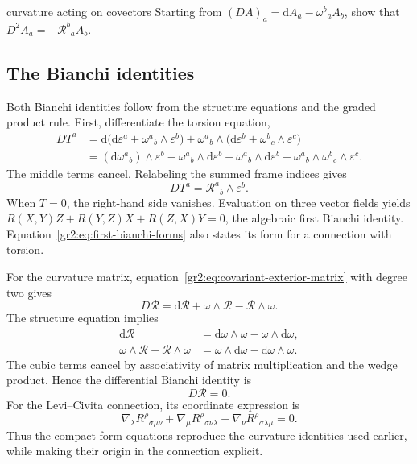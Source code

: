 \documentclass[11pt,a4paper]{article}
\numberwithin{equation}{section}
\newcommand{\dd}{\mathrm d}
\begin{document}
\begin{studentwork}[2.5cm]{curvature acting on covectors}
Starting from \((DA)_a=\dd A_a-\omega^b{}_aA_b\), show that
\(D^2A_a=-\mathcal R^b{}_aA_b\).
\end{studentwork}

\subsection{The Bianchi identities}

Both Bianchi identities follow from the structure equations and the
graded product rule. First, differentiate the torsion equation,
\begin{align*}
 DT^a
 &=\dd\bigl(\dd\varepsilon^a+
             \omega^a{}_b\wedge\varepsilon^b\bigr)
   +\omega^a{}_b\wedge
       \bigl(\dd\varepsilon^b+\omega^b{}_c\wedge\varepsilon^c\bigr)\\
 &=(\dd\omega^a{}_b)\wedge\varepsilon^b
   -\omega^a{}_b\wedge\dd\varepsilon^b
   +\omega^a{}_b\wedge\dd\varepsilon^b
   +\omega^a{}_b\wedge\omega^b{}_c\wedge\varepsilon^c.
\end{align*}
The middle terms cancel. Relabeling the summed frame indices gives
\begin{equation}
 \boxed{DT^a=\mathcal R^a{}_b\wedge\varepsilon^b.}
 \label{gr2:eq:first-bianchi-forms}
\end{equation}
When \(T=0\), the right-hand side vanishes. Evaluation on three
vector fields yields
\(R(X,Y)Z+R(Y,Z)X+R(Z,X)Y=0\), the algebraic first Bianchi identity.
Equation~\eqref{gr2:eq:first-bianchi-forms} also states its form for
a connection with torsion.

For the curvature matrix, equation~\eqref{gr2:eq:covariant-exterior-matrix}
with degree two gives
\[
 D\mathcal R=\dd\mathcal R+
              \omega\wedge\mathcal R-\mathcal R\wedge\omega.
\]
The structure equation implies
\begin{align*}
 \dd\mathcal R&=\dd\omega\wedge\omega
                        -\omega\wedge\dd\omega,\\
 \omega\wedge\mathcal R-\mathcal R\wedge\omega
 &=\omega\wedge\dd\omega-\dd\omega\wedge\omega.
\end{align*}
The cubic terms cancel by associativity of matrix multiplication and
the wedge product. Hence the differential Bianchi identity is
\begin{equation}
 \boxed{D\mathcal R=0.}
 \label{gr2:eq:second-bianchi-forms}
\end{equation}
For the Levi--Civita connection, its coordinate expression is
\[
 \nabla_\lambda R^\rho{}_{\sigma\mu\nu}
 +\nabla_\mu R^\rho{}_{\sigma\nu\lambda}
 +\nabla_\nu R^\rho{}_{\sigma\lambda\mu}=0.
\]
Thus the compact form equations reproduce the curvature identities
used earlier, while making their origin in the connection explicit.
\end{document}
